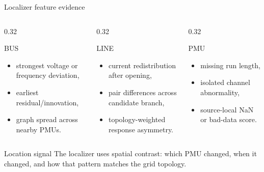 ﻿\documentclass[10pt,aspectratio=169]{beamer}
\begin{document}
\iffalse
\begin{frame}{Localizer feature evidence}
\small
\begin{columns}[T,totalwidth=\textwidth]
\begin{column}{0.32\textwidth}
\begin{block}{BUS}
\begin{itemize}
  \item strongest voltage or frequency deviation,
  \item earliest residual/innovation,
  \item graph spread across nearby PMUs.
\end{itemize}
\end{block}
\end{column}
\begin{column}{0.32\textwidth}
\begin{block}{LINE}
\begin{itemize}
  \item current redistribution after opening,
  \item pair differences across candidate branch,
  \item topology-weighted response asymmetry.
\end{itemize}
\end{block}
\end{column}
\begin{column}{0.32\textwidth}
\begin{block}{PMU}
\begin{itemize}
  \item missing run length,
  \item isolated channel abnormality,
  \item source-local NaN or bad-data score.
\end{itemize}
\end{block}
\end{column}
\end{columns}
\vspace{2mm}
\begin{alertblock}{Location signal}
The localizer uses spatial contrast: which PMU changed, when it changed, and how that pattern matches the grid topology.
\end{alertblock}
\end{frame}
\end{document}

